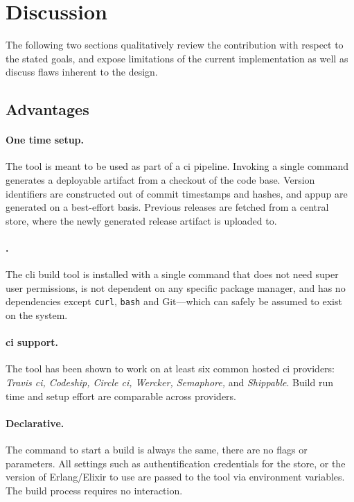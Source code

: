 \cleardoublepage
\section{Discussion}

The following two sections qualitatively review the contribution with respect to the stated goals, and expose limitations of the current implementation as well as discuss flaws inherent to the design.

\subsection{Advantages}

\paragraph{One time setup.} The tool is meant to be used as part of a \acrfull{ci} pipeline. Invoking a single command generates a deployable artifact from a checkout of the code base. Version identifiers are constructed out of commit timestamps and hashes, and \acrfull{appup} are generated on a best-effort basis. Previous releases are fetched from a central store, where the newly generated release artifact is uploaded to.

\paragraph{.} The \acrshort{cli} build tool is installed with a single command that does not need super user permissions, is not dependent on any specific package manager, and has no dependencies except \lstinline|curl|, \lstinline|bash| and Git––which can safely be assumed to exist on the system.

\paragraph{\acrshort{ci} support.} The tool has been shown to work on at least six common hosted \acrfull{ci} providers: \emph{Travis \acrshort{ci}, Codeship, Circle \acrshort{ci}, Wercker, Semaphore,} and \emph{Shippable}. Build run time and setup effort are comparable across providers.

\paragraph{Declarative.} The command to start a build is always the same, there are no flags or parameters. All settings such as authentification credentials for the store, or the version of Erlang/Elixir to use are passed to the tool via environment variables. The build process requires no interaction.

